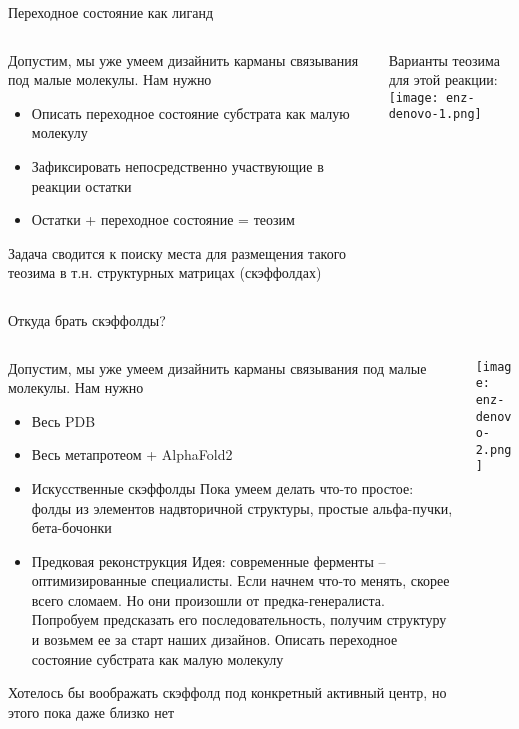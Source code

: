 \begin{frame}{Переходное состояние как лиганд}
\begin{columns}
\begin{column}{0.5\textwidth}
    Допустим, мы уже умеем дизайнить карманы связывания под малые молекулы. Нам нужно
    \begin{itemize}
        \item Описать переходное состояние субстрата как малую молекулу
        \item Зафиксировать непосредственно участвующие в реакции остатки
        \item Остатки + переходное состояние = теозим
    \end{itemize}
    Задача сводится к поиску места для размещения такого теозима в т.н. структурных матрицах (скэффолдах)
\end{column}
\begin{column}{0.5\textwidth}
    Варианты теозима для этой реакции: \\
    \texttt{[image: enz-denovo-1.png]}\\
\end{column}
\end{columns}
\end{frame}


\begin{frame}{Откуда брать скэффолды?}
\begin{columns}
\begin{column}{0.7\textwidth}
    Допустим, мы уже умеем дизайнить карманы связывания под малые молекулы. Нам нужно
    \footnotesize
    \begin{itemize}
        \item Весь PDB
        \item Весь метапротеом + AlphaFold2
        \item Искусственные скэффолды \newline Пока умеем делать что-то простое: фолды из элементов надвторичной структуры, простые альфа-пучки, бета-бочонки
        \item Предковая реконструкция \newline Идея: современные ферменты – оптимизированные специалисты. Если начнем что-то менять, скорее всего сломаем. Но они произошли от предка-генералиста. Попробуем предсказать его последовательность, получим структуру и возьмем ее за старт наших дизайнов. Описать переходное состояние субстрата как малую молекулу
    \end{itemize}
    Хотелось бы воображать скэффолд под конкретный активный центр, но этого пока даже близко нет
\end{column}
\begin{column}{0.3\textwidth}
    \texttt{[image: enz-denovo-2.png]}
\end{column}
\end{columns}
\end{frame}


